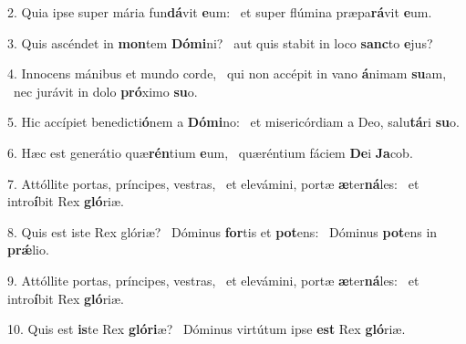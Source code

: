 2. Quia ipse super mária fun\textbf{dá}vit \textbf{e}um: \ast\  et super flúmina præpa\textbf{rá}vit \textbf{e}um.\

3. Quis ascéndet in \textbf{mon}tem \textbf{Dó}\textbf{mi}ni? \ast\  aut quis stabit in loco \textbf{sanc}to \textbf{e}jus?\

4. Innocens mánibus et mundo corde, \dag\  qui non accépit in vano \textbf{á}nimam \textbf{su}am, \ast\  nec jurávit in dolo \textbf{pró}ximo \textbf{su}o.\

5. Hic accípiet benedicti\textbf{ó}nem a \textbf{Dó}\textbf{mi}no: \ast\  et misericórdiam a Deo, salu\textbf{tá}ri \textbf{su}o.\

6. Hæc est generátio quæ\textbf{rén}tium \textbf{e}um, \ast\  quæréntium fáciem \textbf{De}i \textbf{Ja}cob.\

7. Attóllite portas, príncipes, vestras, \dag\  et elevámini, portæ \textbf{æ}ter\textbf{ná}les: \ast\  et intro\textbf{í}bit Rex \textbf{gló}riæ.\

8. Quis est iste Rex glóriæ? \dag\  Dóminus \textbf{for}tis et \textbf{pot}ens: \ast\  Dóminus \textbf{pot}ens in \textbf{prǽ}lio.\

9. Attóllite portas, príncipes, vestras, \dag\  et elevámini, portæ \textbf{æ}ter\textbf{ná}les: \ast\  et intro\textbf{í}bit Rex \textbf{gló}riæ.\

10. Quis est \textbf{is}te Rex \textbf{gló}\textbf{ri}æ? \ast\  Dóminus virtútum ipse \textbf{est} Rex \textbf{gló}riæ.\

